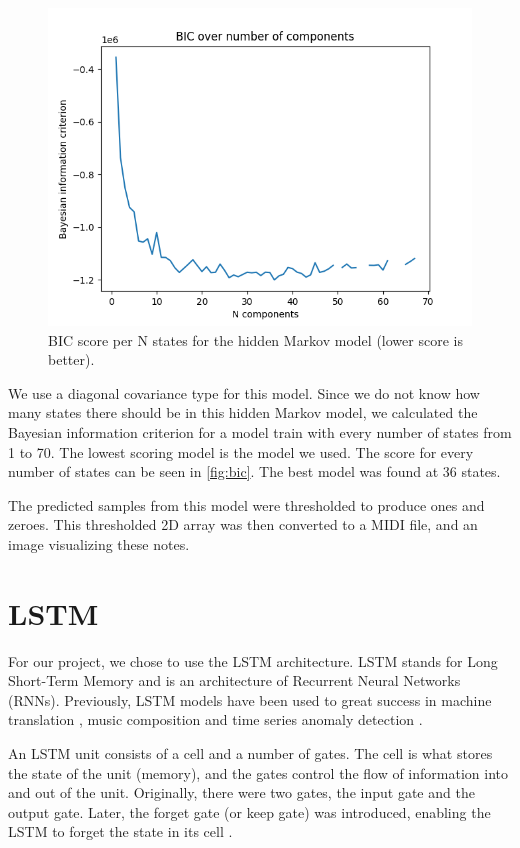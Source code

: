 \documentclass[11pt, twocolumn]{article}
\begin{document}
\begin{figure}
    \centering
    \includegraphics[width=\linewidth]{images/hmm_unfin_bic.png}
    \caption{BIC score per N states for the hidden Markov model (lower score is better).}
    \label{fig:bic}
\end{figure}

We use a diagonal covariance type for this model. Since we do not know how many states there should be in this hidden Markov model, we calculated the Bayesian information criterion for a model train with every number of states from 1 to 70. The lowest scoring model is the model we used. The score for every number of states can be seen in \autoref{fig:bic}. The best model was found at 36 states.

The predicted samples from this model were thresholded to produce ones and zeroes. This thresholded 2D array was then converted to a MIDI file, and an image visualizing these notes. 

\section{LSTM}
For our project, we chose to use the LSTM architecture. LSTM stands for Long Short-Term Memory and is an architecture of Recurrent Neural Networks (RNNs). Previously, LSTM models have been used to great success in machine translation \cite{googleLSTMtranslation}, music composition \cite{Eck02learningthe} and time series anomaly detection \cite{malhotra2015long}.

An LSTM unit consists of a cell and a number of gates. The cell is what stores the state of the unit (memory), and the gates control the flow of information into and out of the unit. Originally, there were two gates, the input gate and the output gate. Later, the forget gate (or keep gate) was introduced, enabling the LSTM to forget the state in its cell \cite{LSTMSearchSpaceOdyssey}.
\end{document}
